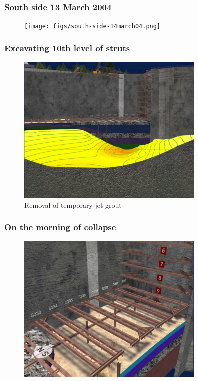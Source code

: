 \documentclass[notes]{beamer}
\begin{document}
\begin{frame}
\frametitle{South side 13 March 2004}
\begin{figure}[ht]
	\centering
	\texttt{[image: figs/south-side-14march04.png]}
\end{figure}
\end{frame}

\begin{frame}
\frametitle{Excavating 10th level of struts}
\begin{figure}[ht]
	\centering
	\includegraphics[width=0.8\textwidth]{figs/excavation-10-struts-jgp.png}
	\caption*{Removal of temporary jet grout}
\end{figure}
\end{frame}

\begin{frame}
\frametitle{On the morning of collapse}
\begin{figure}[ht]
	\centering
	\includegraphics[width=0.8\textwidth]{figs/observation-morning-collapse.png}
\end{figure}
\end{frame}
\end{document}

